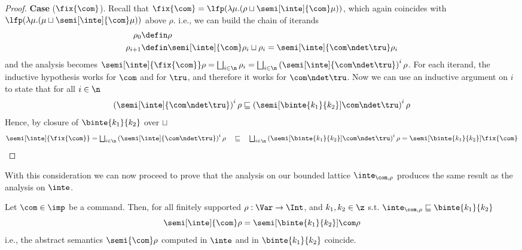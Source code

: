 \begin{proof}
  \medskip

  \noindent
  \textbf{Case} (\(\fix{\com}\)).
  Recall that
  \(\fix{\com} = {\lfp(\lambda \mu . (\rho \sqcup
    \semi[\inte]{\com}\mu))}\), which again coincides with
  \({\lfp(\lambda \mu . (\mu \sqcup \semi[\inte]{\com}\mu))}\) above
  \(\rho\). i.e., we can build the chain of iterands
  \begin{align*}
    \rho_0 & \defin \rho \\
    \rho_{i+1} & \defin \semi[\inte]{\com}\rho_i \sqcup \rho_i = \semi[\inte]{\com \ndet \tru}\rho_i
  \end{align*}
  and the analysis becomes
  \({\semi[\inte]{\fix{\com}}\rho} =
  {\textstyle\bigsqcup_{i\in\n}\rho_i} =
  {\textstyle\bigsqcup_{i\in\n}\left(\semi[\inte]{\com \ndet
        \tru}\right)^i\rho}\).  For each iterand, the inductive
  hypothesis works for \(\com\) and for \(\tru\), and therefore it
  works for \(\com \ndet \tru\). Now we can use an inductive argument
  on \(i\) to state that for all \(i \in\n\)
  \begin{equation*}
    {\left(\semi[\inte]{\com\ndet\tru}\right)^i\rho} \sqsubseteq {\left(\semi[\binte{k_1}{k_2}]{\com\ndet\tru}\right)^i\rho}
  \end{equation*}
  Hence, by closure of \(\binte{k_1}{k_2}\) over \(\sqcup\)
  \begin{equation*}
    {\semi[\inte]{\fix{\com}}} =
    {\textstyle\bigsqcup_{i\in\n}\left(\semi[\inte]{\com\ndet\tru}\right)^i \rho}
    \quad \sqsubseteq \quad
    {\textstyle\bigsqcup_{i\in\n}\left(\semi[\binte{k_1}{k_2}]{\com\ndet\tru}\right)^i \rho} =
    {\semi[\binte{k_1}{k_2}]{\fix{\com}}}
  \end{equation*}

\end{proof}
With this consideration we can now proceed to prove that the analysis
on our bounded lattice \(\inte_{\com,\rho}\) produces the same result
as the analysis on \(\inte\).


\begin{theorem}
  Let \(\com\in \imp\) be a command. Then, for all finitely supported
  \(\rho : \Var \to \Int\), and \(k_1, k_2\in \z\) s.t.
  \(\inte_{\com,\rho} \sqsubseteq \binte{k_1}{k_2} \)
  \begin{equation*}
    \semi[\inte]{\com}\rho = \semi[\binte{k_1}{k_2}]{\com}\rho
  \end{equation*}
  i.e., the abstract semantics \(\semi{\com} \rho\)
  computed in \(\inte\) and in \(\binte{k_1}{k_2}\) coincide.
\end{theorem}

